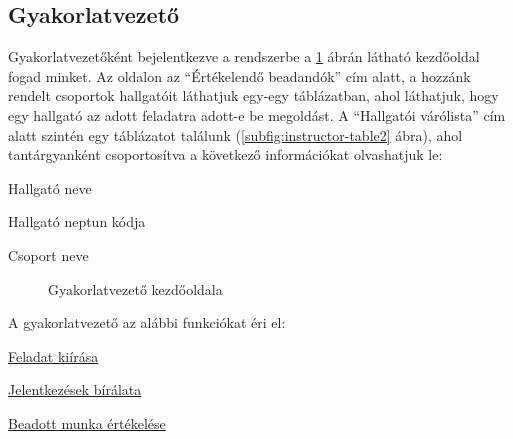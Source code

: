 \subsection{Gyakorlatvezető}\label{step:instructor-role}
Gyakorlatvezetőként bejelentkezve a rendszerbe a \ref{fig:instructor-home} ábrán látható kezdőoldal fogad minket. Az oldalon az ``Értékelendő beadandók'' cím alatt, a hozzánk rendelt csoportok hallgatóit láthatjuk egy-egy táblázatban, ahol láthatjuk, hogy egy hallgató az adott feladatra adott-e be megoldást. A ``Hallgatói várólista'' cím alatt szintén egy táblázatot találunk (\ref{subfig:instructor-table2} ábra), ahol tantárgyanként csoportosítva a következő információkat olvashatjuk le:
\begin{compactitem}
    \item Hallgató neve
	\item Hallgató neptun kódja
	\item Csoport neve
\end{compactitem}
\begin{figure}[H]
	\centering
	\hspace{5pt}
	\caption{Gyakorlatvezető kezdőoldala}
	\label{fig:instructor-home}
\end{figure}
A gyakorlatvezető az alábbi funkciókat éri el:
\begin{compactitem}
    \item \hyperref[step:instructor-create-assignment]{Feladat kiírása}
	\item \hyperref[step:instructor-pending]{Jelentkezések bírálata}
	\item \hyperref[step:instructor-eval]{Beadott munka értékelése}
\end{compactitem}
